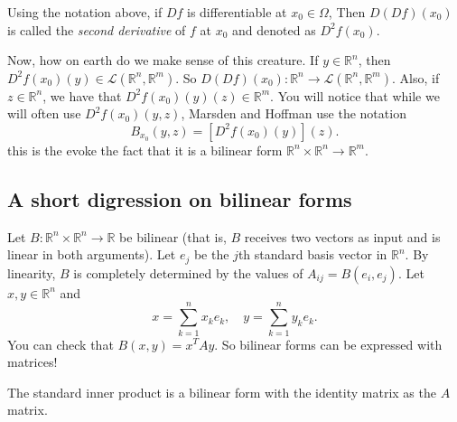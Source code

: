 \documentclass[11pt]{article}
\theoremstyle{definition}
\newcommand{\R}{\mathbb{R}}                      %
\begin{document}
\begin{mdframed}[backgroundcolor = blue!10]
\vspace{+0.1cm}

 Using the notation above, if $Df$ is differentiable at $x_0\in\Omega$, Then $D(Df)(x_0)$ is called the \textit{second derivative} of $f$ at $x_0$ and denoted as $D^2f(x_0)$.

\end{mdframed}
Now, how on earth do we make sense of this creature. If $y\in \R^n$, then $D^2 f(x_0)(y)\in \mathcal{L}(\R^n,\R^m)$. So $D(Df)(x_0):\R^n\to\mathcal{L}(\R^n,\R^m)$. Also, if $z\in \R^n$, we have that $D^2 f(x_0)(y)(z)\in\R^m$. You will notice that while we will often use $D^2f (x_0)(y,z)$, Marsden and Hoffman use the notation
$$
B_{x_0}(y,z)=\left[D^2 f(x_0)(y)\right](z).
$$
this is the evoke the fact that it is a bilinear form $\R^n\times\R^n\to\R^m$.


\subsection{A short digression on bilinear forms}
Let $B:\R^n\times\R^n\to \R$ be bilinear (that is, $B$ receives two vectors as input and is linear in both arguments). Let $e_j$ be the $j$th standard basis vector in $\R^n$. By linearity, $B$ is completely determined by the values of $A_{ij}=B(e_i,e_j)$. Let $x,y\in \R^n$ and
$$
x=\sum_{k=1}^n x_ke_k,\quad y=\sum_{k=1}^n y_ke_k.
$$
You can check that $B(x,y)=x^T Ay$. So bilinear forms can be expressed with matrices!

\ex The standard inner product is a bilinear form with the identity matrix as the $A$ matrix. 
\end{document}

